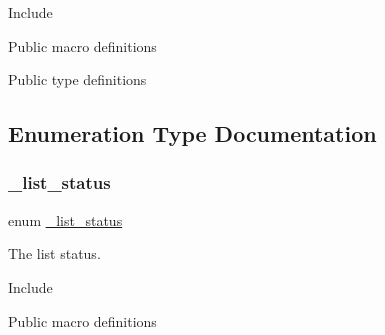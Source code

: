 Include \begin{DoxyVerb}\end{DoxyVerb}






Public macro definitions \begin{DoxyVerb}\end{DoxyVerb}






Public type definitions \begin{DoxyVerb}\end{DoxyVerb}
 

\subsection{Enumeration Type Documentation}
\mbox{\label{group___generic_list_ga803f4a1563b84327f6c4ece67bee52ff}} 
\subsubsection{\texorpdfstring{\_list\_status}{\_list\_status}}
{\footnotesize\ttfamily enum \mbox{\hyperlink{group___generic_list_ga803f4a1563b84327f6c4ece67bee52ff}{\+\_\+list\+\_\+status}}}



The list status. 





Include \begin{DoxyVerb}\end{DoxyVerb}






Public macro definitions \begin{DoxyVerb}\end{DoxyVerb}






